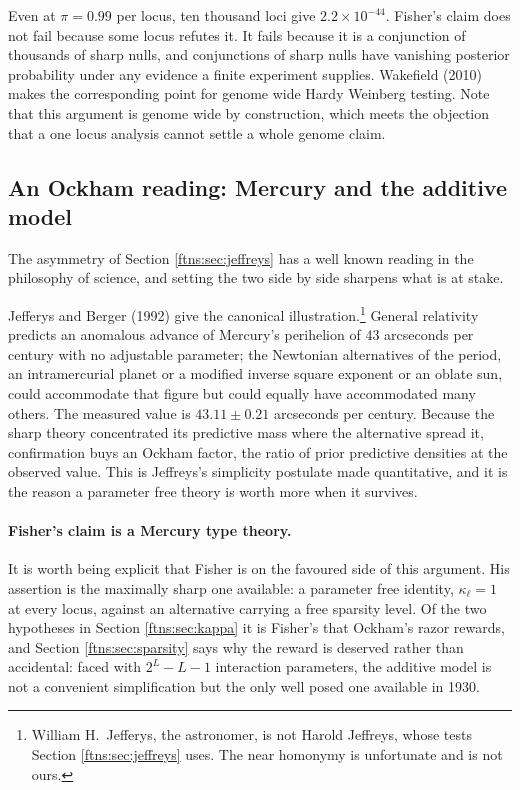 Even at $\pi=0.99$ per locus, ten
thousand loci give $2.2\times10^{-44}$. Fisher's claim does not fail because some locus refutes it.
It fails because it is a conjunction of thousands of sharp nulls, and conjunctions of sharp nulls
have vanishing posterior probability under any evidence a finite experiment supplies. Wakefield
(2010) makes the corresponding point for genome wide Hardy Weinberg testing. Note that this
argument is genome wide by construction, which meets the objection that a one locus analysis cannot
settle a whole genome claim.

\subsection{An Ockham reading: Mercury and the additive model}
\label{ftns:sec:ockham}

The asymmetry of Section \ref{ftns:sec:jeffreys} has a well known reading in the philosophy of
science, and setting the two side by side sharpens what is at stake.

Jefferys and Berger (1992) give the canonical illustration.\footnote{William H.\ Jefferys, the
astronomer, is not Harold Jeffreys, whose tests Section \ref{ftns:sec:jeffreys} uses. The near homonymy
is unfortunate and is not ours.} General relativity predicts an anomalous advance of Mercury's
perihelion of $43$ arcseconds per century with no adjustable parameter; the Newtonian alternatives
of the period, an intramercurial planet or a modified inverse square exponent or an oblate sun,
could accommodate that figure but could equally have accommodated many others. The measured value
is $43.11\pm0.21$ arcseconds per century. Because the sharp theory concentrated its predictive mass
where the alternative spread it, confirmation buys an Ockham factor, the ratio of prior predictive
densities at the observed value. This is Jeffreys's simplicity postulate made quantitative, and it
is the reason a parameter free theory is worth more when it survives.

\paragraph{Fisher's claim is a Mercury type theory.} It is worth being explicit that Fisher is on
the favoured side of this argument. His assertion is the maximally sharp one available: a
parameter free identity, $\kappa_\ell=1$ at every locus, against an alternative carrying a free
sparsity level. Of the two hypotheses in Section \ref{ftns:sec:kappa} it is Fisher's that Ockham's razor
rewards, and Section \ref{ftns:sec:sparsity} says why the reward is deserved rather than accidental:
faced with $2^L-L-1$ interaction parameters, the additive model is not a convenient simplification
but the only well posed one available in 1930.

